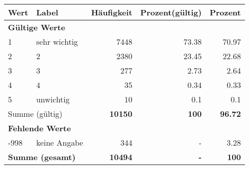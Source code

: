      \begin{longtable}{lXrrr}
     \toprule
     \textbf{Wert} & \textbf{Label} & \textbf{Häufigkeit} & \textbf{Prozent(gültig)} & \textbf{Prozent} \\
     \endhead
     \midrule
     \multicolumn{5}{l}{\textbf{Gültige Werte}}\\

     1 &
     \multicolumn{1}{X}{ sehr wichtig   } &


       \num{7448} &
       \num[round-mode=places,round-precision=2]{73,38} &
         \num[round-mode=places,round-precision=2]{70,97} \\

     2 &
     \multicolumn{1}{X}{ 2   } &


       \num{2380} &
       \num[round-mode=places,round-precision=2]{23,45} &
         \num[round-mode=places,round-precision=2]{22,68} \\

     3 &
     \multicolumn{1}{X}{ 3   } &


       \num{277} &
       \num[round-mode=places,round-precision=2]{2,73} &
         \num[round-mode=places,round-precision=2]{2,64} \\

     4 &
     \multicolumn{1}{X}{ 4   } &


       \num{35} &
       \num[round-mode=places,round-precision=2]{0,34} &
         \num[round-mode=places,round-precision=2]{0,33} \\

     5 &
     \multicolumn{1}{X}{ unwichtig   } &


       \num{10} &
       \num[round-mode=places,round-precision=2]{0,1} &
         \num[round-mode=places,round-precision=2]{0,1} \\
     \midrule
     \multicolumn{2}{l}{Summe (gültig)} &
       \textbf{\num{10150}} &
     \textbf{100} &
       \textbf{\num[round-mode=places,round-precision=2]{96,72}} \\
     \multicolumn{5}{l}{\textbf{Fehlende Werte}}\\
       -998 &
       keine Angabe &
         \num{344} &
        - &
         \num[round-mode=places,round-precision=2]{3,28} \\
     \midrule
     \multicolumn{2}{l}{\textbf{Summe (gesamt)}} &
          \textbf{\num{10494}} &
        \textbf{-} &
        \textbf{100} \\
     \bottomrule
     \end{longtable}
     
